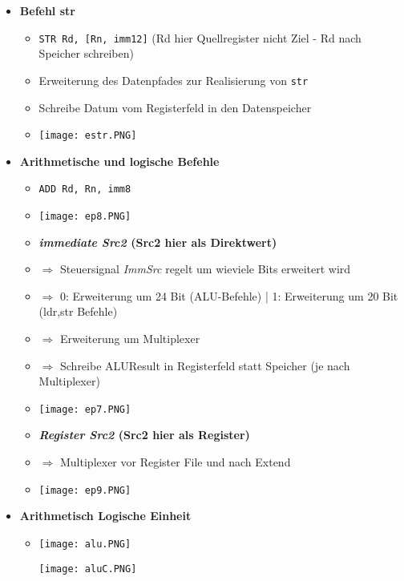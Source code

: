 \begin{itemize}
        \item \textbf{Befehl str}
            \begin{itemize}
                \item \texttt{STR Rd, [Rn, imm12]} (Rd hier Quellregister nicht Ziel - Rd nach Speicher schreiben)
                \item Erweiterung des Datenpfades zur Realisierung von \texttt{str}
                \item Schreibe Datum vom Registerfeld in den Datenspeicher
                \item[] \texttt{[image: estr.PNG]}
            \end{itemize}

\pagebreak
        
        \item \textbf{Arithmetische und logische Befehle}
            \begin{itemize}
                \item \texttt{ADD Rd, Rn, imm8}
                \item[] \texttt{[image: ep8.PNG]}
                \item \textbf{\textit{immediate Src2} (Src2 hier als Direktwert)}
                \item[] $\Rightarrow$ Steuersignal \textit{ImmSrc} regelt um wieviele Bits erweitert wird
                \item[] $\Rightarrow$ 0: Erweiterung um 24 Bit (ALU-Befehle) | 1: Erweiterung um 20 Bit (ldr,str Befehle)
                \item[] $\Rightarrow$ Erweiterung um Multiplexer 
                \item[] $\Rightarrow$ Schreibe ALUResult in Registerfeld statt Speicher (je nach Multiplexer)
                \item[] \texttt{[image: ep7.PNG]}
                \item \textbf{\textit{Register Src2} (Src2 hier als Register)}
                \item[] $\Rightarrow$ Multiplexer vor Register File und nach Extend
                \item[] \texttt{[image: ep9.PNG]}
            \end{itemize}

        \item \textbf{Arithmetisch Logische Einheit}
            \begin{itemize}
                \item[] 
                    \begin{minipage}{0.5\textwidth}
                        \texttt{[image: alu.PNG]}
                    \end{minipage}
                    \begin{minipage}{0.4\textwidth}
                        \texttt{[image: aluC.PNG]}
                    \end{minipage}
            \end{itemize}


\end{itemize}
